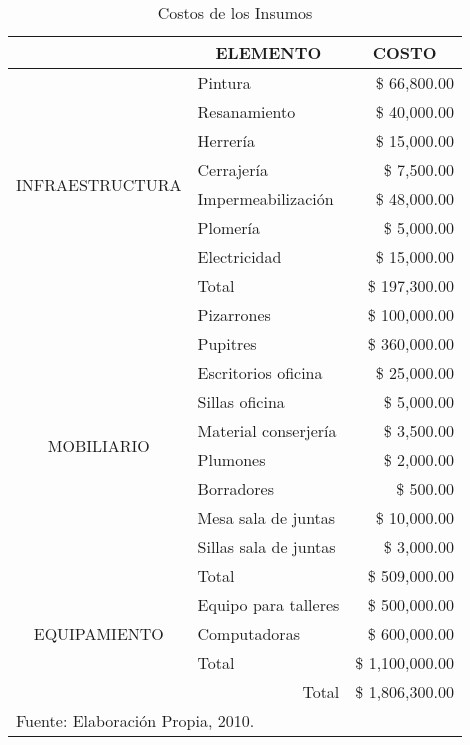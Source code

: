\begin{table}
    \centering
    \caption{Costos de los Insumos}
    \label{tbl:Proy:Insumos}
    \footnotesize
    \begin{tabular}{c|l|r}
      & \multicolumn{1}{c|}{ELEMENTO}    & \multicolumn{1}{c}{COSTO} \\
        \hline
        \hline
        \multirow{8}{*}{INFRAESTRUCTURA} &
        Pintura                          & \$ 66,800.00              \\
      & Resanamiento                     & \$ 40,000.00              \\
      & Herrería                         & \$ 15,000.00              \\
      & Cerrajería                       & \$ 7,500.00               \\
      & Impermeabilización               & \$ 48,000.00              \\
      & Plomería                         & \$ 5,000.00               \\
      & Electricidad                     & \$ 15,000.00              \\
        \cline{2-3}
      & Total                            & \$ 197,300.00             \\
        \hline
        \multirow{10}{*}{MOBILIARIO}     &
        Pizarrones                       & \$ 100,000.00             \\
      & Pupitres                         & \$ 360,000.00             \\
      & Escritorios oficina              & \$ 25,000.00              \\
      & Sillas oficina                   & \$ 5,000.00               \\
      & Material conserjería             & \$ 3,500.00               \\
      & Plumones                         & \$ 2,000.00               \\
      & Borradores                       & \$ 500.00                 \\
      & Mesa sala de juntas              & \$ 10,000.00              \\
      & Sillas sala de juntas            & \$ 3,000.00               \\
        \cline{2-3}
      & Total                            & \$ 509,000.00             \\
        \hline
        \multirow{3}{*}{EQUIPAMIENTO}    &
        Equipo para talleres             & \$ 500,000.00             \\
      & Computadoras                     & \$ 600,000.00             \\
        \cline{2-3}
      & Total                            & \$ 1,100,000.00           \\
        \hline
        \hline
        \multicolumn{2}{r|}{Total}       & \$ 1,806,300.00           \\
        \hline
        \multicolumn{3}{l}{\footnotesize Fuente: Elaboración Propia, 2010.}
    \end{tabular}
\end{table}
